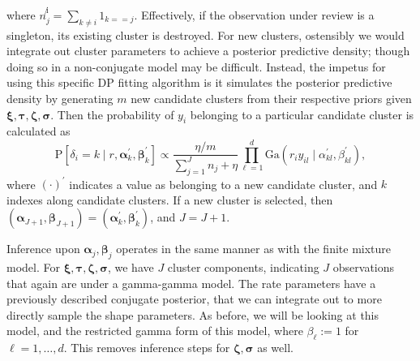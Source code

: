   where $n_j^{\not i} = {\textstyle\sum}_{k\neq i}1_{k == j}$.  Effectively, if the observation under review is a
  singleton, its existing cluster is destroyed.  For new clusters, ostensibly we would integrate out
  cluster parameters to achieve a posterior predictive density; though doing so in a
  non-conjugate model may be difficult.  Instead, the impetus for using this specific DP fitting algorithm
  is it simulates the posterior predictive density by generating $m$ new candidate clusters from
  their respective priors given $\bm{ \xi,\tau,\zeta,\sigma}$.  Then the probability of $y_i$
  belonging to a particular candidate cluster is calculated as
  \begin{equation}
    \label{eqn:dpdeltanew}
    \text{P}\left[\delta_i = k\mid r, \bm{ \alpha}_k^{\prime}, \bm{ \beta}_k^{\prime}\right] \propto
        \frac{\eta / m}{\sum_{j = 1}^{J} n_j + \eta}
        {\textstyle\prod}_{\ell = 1}^d\text{Ga}\left(r_iy_{il}\mid\alpha_{kl}^{\prime},\beta_{kl}^{\prime}\right),
  \end{equation}
  where $(\cdot)^{\prime}$ indicates a value as belonging to a new candidate cluster, and $k$ indexes
  along candidate clusters.  If a new cluster is selected, then
  $(\bm{\alpha}_{J+1},\bm{\beta}_{J+1}) = (\bm{\alpha}_k^{\prime},\bm{\beta}_k^{\prime})$, and $J = J + 1$.

Inference upon $\bm{ \alpha}_j,\bm{ \beta}_j$ operates in the same manner as with the finite mixture
  model.  For $\bm{ \xi,\tau,\zeta,\sigma}$, we have $J$ cluster components, indicating $J$
  observations that again are under a gamma-gamma model.  The rate parameters have a previously
  described conjugate posterior, that we can integrate out to more directly sample the shape
  parameters.  As before, we will be looking at this model, and the restricted gamma form of this model, where
  $\beta_{\ell} := 1$ for $\ell = 1,\ldots,d$.  This removes inference steps for $\bm{ \zeta},\bm{ \sigma}$
  as well.


